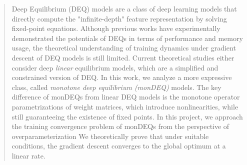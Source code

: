 \documentclass[twoside]{article}
\begin{document}
%

%


\begin{abstract}
Deep Equilibrium (DEQ) models are a class of deep learning models that directly compute the "infinite-depth" feature representation by solving fixed-point equations. 
Although previous works have experimentally demonstrated the potentials of DEQs in terms of performance and memory usage, the theoretical understanding of training dynamics under gradient descent of DEQ models is still limited. 
Current theoretical studies either consider deep \emph{linear} equilibrium models, which are a simplified and constrained version of DEQ.
In this work, we analyze a more expressive class, called \emph{monotone deep equilibrium (monDEQ)} models.
The key difference of monDEQs from linear DEQ models is the monotone operator parametrizations of weight matrices, which introduce nonlinearities, while still guaranteeing the existence of fixed points.
In this project, we approach the training convergence problem of monDEQs from the perspective of overparameterization
We theoretically prove that under suitable conditions, the gradient descent converges to the global optimum at a linear rate. 
%

%
 
%
\end{abstract}
\end{document}
